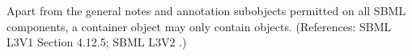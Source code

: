 Apart from the general notes and annotation subobjects permitted on all
SBML components, a \ListOfEventAssignments container object may only
contain \EventAssignment objects.  (References: SBML L3V1 Section 4.12.5; SBML L3V2
.)
